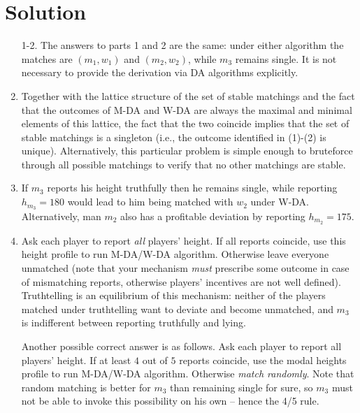 \documentclass[a4paper]{article}
\begin{document}
\section*{Solution}
	\begin{enumerate}
		\item[1-2.] The answers to parts 1 and 2 are the same: under either algorithm the matches are $(m_1, w_1)$ and $(m_2, w_2)$, while $m_3$ remains single. It is not necessary to provide the derivation via DA algorithms explicitly.
		
		
		\setcounter{enumi}{2}
		\item Together with the lattice structure of the set of stable matchings and the fact that the outcomes of M-DA and W-DA are always the maximal and minimal elements of this lattice, the fact that the two coincide implies that the set of stable matchings is a singleton (i.e., the outcome identified in (1)-(2) is unique). Alternatively, this particular problem is simple enough to bruteforce through all possible matchings to verify that no other matchings are stable.
		
		\item If $m_3$ reports his height truthfully then he remains single, while reporting $h_{m_3} = 180$ would lead to him being matched with $w_2$ under W-DA. Alternatively, man $m_2$ also has a profitable deviation by reporting $h_{m_2} = 175$.
		
		
		\item Ask each player to report \emph{all} players' height. If all reports coincide, use this height profile to run M-DA/W-DA algorithm. Otherwise leave everyone unmatched (note that your mechanism \emph{must} prescribe some outcome in case of mismatching reports, otherwise players' incentives are not well defined). Truthtelling is an equilibrium of this mechanism: neither of the players matched under truthtelling want to deviate and become unmatched, and $m_3$ is indifferent between reporting truthfully and lying.
		
		Another possible correct answer is as follows. Ask each player to report all players' height. If at least $4$ out of $5$ reports coincide, use the modal heights profile to run M-DA/W-DA algorithm. Otherwise \emph{match randomly}. Note that random matching is better for $m_3$ than remaining single for sure, so $m_3$ must not be able to invoke this possibility on his own -- hence the 4/5 rule.
	\end{enumerate}
\fi
\end{document}
